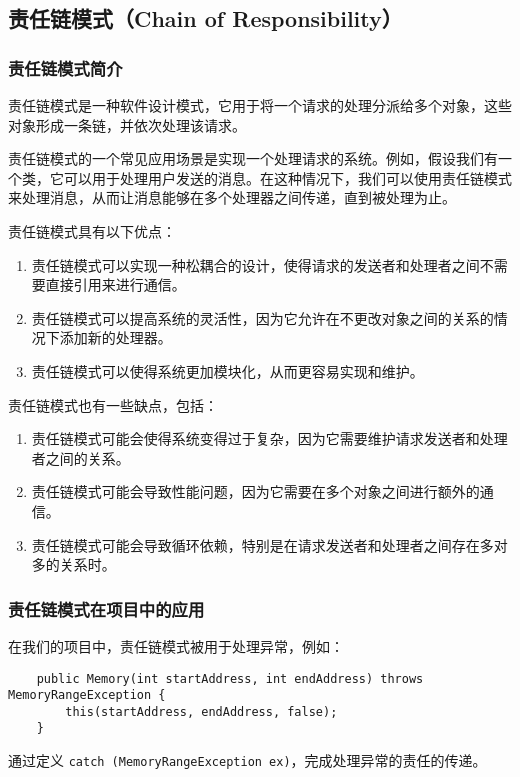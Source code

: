 \subsection{责任链模式（Chain of Responsibility）}

\subsubsection{责任链模式简介}

责任链模式是一种软件设计模式，它用于将一个请求的处理分派给多个对象，这些对象形成一条链，并依次处理该请求。

责任链模式的一个常见应用场景是实现一个处理请求的系统。例如，假设我们有一个类，它可以用于处理用户发送的消息。在这种情况下，我们可以使用责任链模式来处理消息，从而让消息能够在多个处理器之间传递，直到被处理为止。

责任链模式具有以下优点：
\begin{enumerate}
\item 责任链模式可以实现一种松耦合的设计，使得请求的发送者和处理者之间不需要直接引用来进行通信。
\item 责任链模式可以提高系统的灵活性，因为它允许在不更改对象之间的关系的情况下添加新的处理器。
\item 责任链模式可以使得系统更加模块化，从而更容易实现和维护。
\end{enumerate}

责任链模式也有一些缺点，包括：
\begin{enumerate}
\item 责任链模式可能会使得系统变得过于复杂，因为它需要维护请求发送者和处理者之间的关系。
\item 责任链模式可能会导致性能问题，因为它需要在多个对象之间进行额外的通信。
\item 责任链模式可能会导致循环依赖，特别是在请求发送者和处理者之间存在多对多的关系时。
\end{enumerate}

\subsubsection{责任链模式在项目中的应用}

在我们的项目中，责任链模式被用于处理异常，例如：
\begin{lstlisting}
    public Memory(int startAddress, int endAddress) throws MemoryRangeException {
        this(startAddress, endAddress, false);
    }
\end{lstlisting}

通过定义 \lstinline{catch (MemoryRangeException ex)}，完成处理异常的责任的传递。